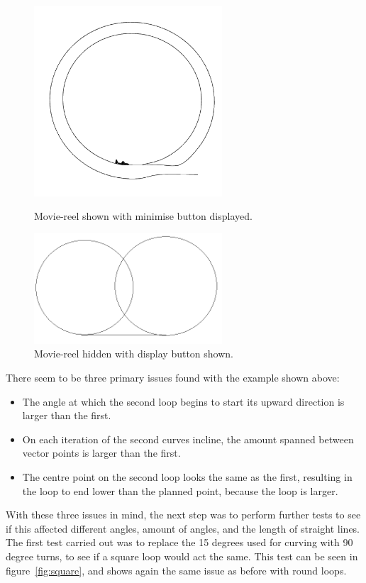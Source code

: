 \begin{figure}[h!]
  \centering
  \parbox{7cm}{
    \includegraphics[width=7cm]{images/actual.png}
    \caption{Movie-reel shown with minimise button displayed.}
    \label{fig:happening}}
  \qquad
  \begin{minipage}{7cm}
    \includegraphics[width=7cm]{images/supposed.png}
    \caption{Movie-reel hidden with display button shown.}
    \label{fig:supposed}
  \end{minipage}
\end{figure}

There seem to be three primary issues found with the example shown above:
\begin{itemize}
  \item The angle at which the second loop begins to start its upward direction is larger than the first.
  \item On each iteration of the second curves incline, the amount spanned between vector points is larger than the first.
  \item The centre point on the second loop looks the same as the first, resulting in the loop to end lower than the planned point, because the loop is larger.
\end{itemize}

With these three issues in mind, the next step was to perform further tests to see if this affected different angles, amount of angles, and the length of straight lines. The first test carried out was to replace the 15 degrees used for curving with 90 degree turns, to see if a square loop would act the same. This test can be seen in figure~\ref{fig:square}, and shows again the same issue as before with round loops.

